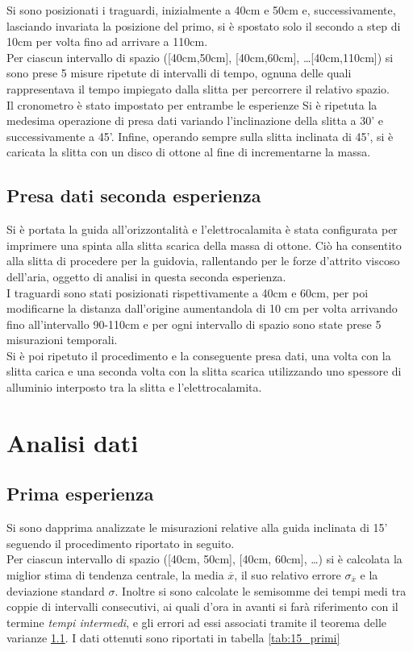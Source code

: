 \documentclass[a4paper,11pt,oneside]{article}
\begin{document}
Si sono posizionati i traguardi, inizialmente a 40cm e 50cm e, successivamente, lasciando invariata la posizione del primo, si è spostato solo il secondo a step di 10cm per volta fino ad arrivare a 110cm. \\
Per ciascun intervallo di spazio ([40cm,50cm], [40cm,60cm], \dots [40cm,110cm]) si sono prese 5 misure ripetute di intervalli di tempo, ognuna delle quali rappresentava il tempo impiegato dalla slitta per percorrere il relativo spazio.\\  %
Il cronometro è stato impostato per entrambe le esperienze
Si è ripetuta la medesima operazione di presa dati variando l'inclinazione della slitta a 30' e successivamente a 45'.
Infine, operando sempre sulla slitta inclinata di 45', si è caricata la slitta con un disco di ottone al fine di incrementarne la massa.

\subsection{Presa dati seconda esperienza}
Si è portata la guida all'orizzontalità e l'elettrocalamita è stata configurata per imprimere una spinta alla slitta scarica della massa di ottone. Ciò ha consentito alla slitta di procedere per la guidovia, rallentando per le forze d'attrito viscoso dell'aria, oggetto di analisi in questa seconda esperienza.\\
I traguardi sono stati posizionati rispettivamente a 40cm e 60cm, per poi modificarne la distanza dall'origine aumentandola di 10 cm per volta arrivando fino all'intervallo 90-110cm e per ogni intervallo di spazio sono state prese 5 misurazioni temporali.\\
Si è poi ripetuto il procedimento e la conseguente presa dati, una volta con la slitta carica e una seconda volta con la slitta scarica utilizzando uno spessore di alluminio interposto tra la slitta e l'elettrocalamita.

\section{Analisi dati}
\subsection{Prima esperienza}
Si sono dapprima analizzate le misurazioni relative alla guida inclinata di 15' seguendo il procedimento riportato in seguito.\\
Per ciascun intervallo di spazio ([40cm, 50cm], [40cm, 60cm], \dots) si è calcolata la miglior stima di tendenza centrale, la media $\overline{x}$, il suo relativo errore $\sigma_{\overline{x}}$ e la deviazione standard $\sigma$. Inoltre si sono calcolate le semisomme dei tempi medi tra coppie di intervalli consecutivi, ai quali d'ora in avanti si farà riferimento con il termine \textit{tempi intermedi}, e gli errori ad essi associati tramite il teorema delle varianze \ref{}.
I dati ottenuti sono riportati in tabella \ref{tab:15_primi}
\end{document}
